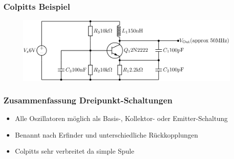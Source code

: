 \begin{frame}
  \frametitle{Colpitts Beispiel}
  \begin{center}
    \begin{figure}
      \includegraphics[width=1\textwidth,height=.7\textheight,keepaspectratio]{a07/NPN_Colpitts_oscillator_collector_coil.png} \\[1em]
    \end{figure}
  \end{center}
\end{frame}

\begin{frame}
  \frametitle{Zusammenfassung Dreipunkt-Schaltungen}
  \begin{itemize}
    \item Alle Oszillatoren möglich als Basis-, Kollektor- oder Emitter-Schaltung
    \item Benannt nach Erfinder und unterschiedliche Rückkopplungen
    \item Colpitts sehr verbreitet da simple Spule
  \end{itemize}
\end{frame}

